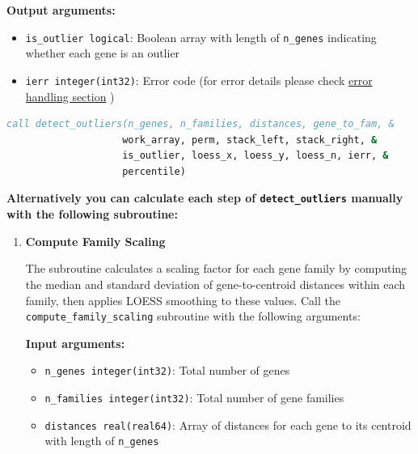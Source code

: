 \documentclass[11pt]{article}
\begin{document}
\begin{enumerate}
\begin{enumerate}
	      	      \textbf{Output arguments:}
	      	      \begin{itemize}
	      	      	\item \texttt{is\_outlier logical}: Boolean array with length of \texttt{n\_genes}
	      	      	      indicating whether each gene is an outlier
	      	      	      
	      	      	\item \texttt{ierr integer(int32)}: Error code (for error details
	      	      	      please check \hyperref[sec:error-handling]{error handling section}
	      	      	      )
	      	      \end{itemize}
	      	      
	      	      \begin{lstlisting}[language=Fortran, caption={Gene Outlier Calculation}]
call detect_outliers(n_genes, n_families, distances, gene_to_fam, &
                    work_array, perm, stack_left, stack_right, &
                    is_outlier, loess_x, loess_y, loess_n, ierr, &
                    percentile)
	      	      \end{lstlisting}
	      	      
	      	      \textbf{Alternatively you can calculate each step of \texttt{detect\_outliers}
	      	      manually with the following subroutine:}
	      	      \begin{enumerate}
	      	      	\item \textbf{Compute Family Scaling}
	      	      	      
	      	      	      The subroutine calculates a scaling factor for each gene family by
	      	      	      computing the median and standard deviation of gene-to-centroid distances
	      	      	      within each family, then applies LOESS smoothing to these values. Call
	      	      	      the \texttt{compute\_family\_scaling} subroutine with the
	      	      	      following arguments:
	      	      	      
	      	      	      \textbf{Input arguments:}
	      	      	      \begin{itemize}
	      	      	      	\item \texttt{n\_genes integer(int32)}: Total number of genes
	      	      	      	      
	      	      	      	\item \texttt{n\_families integer(int32)}: Total number of gene families
	      	      	      	      
	      	      	      	\item \texttt{distances real(real64)}: Array of distances for each
	      	      	      	      gene to its centroid with length of \texttt{n\_genes}
	      	      	      	      

\end{itemize}
\end{enumerate}
\end{enumerate}
\end{enumerate}
\end{document}
